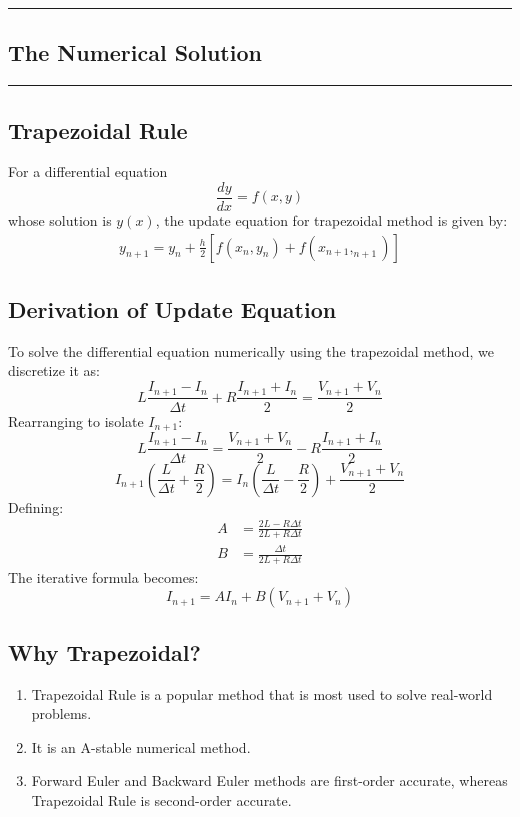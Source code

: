 \newpage
{\color{gray}\hrule}
\begin{center}
\section{The Numerical Solution}
\bigskip
\end{center}
{\color{gray}\hrule}
\begin{multicols}{2}

\subsection{Trapezoidal Rule}
For a differential equation $$\frac{dy}{dx} = f(x,y)$$ whose solution is $y(x)$, the update equation for trapezoidal method is given by:
\begin{align}
    y_{n+1} = y_n + \frac{h}{2}\left[ f(x_n,y_n) + f(x_{n+1},_{n+1}) \right]
\end{align}
\subsection{Derivation of Update Equation}
To solve the differential equation numerically using the trapezoidal method, we discretize it as:
\begin{equation}
L \frac{I_{n+1} - I_n}{\Delta t} + R \frac{I_{n+1} + I_n}{2} = \frac{V_{n+1} + V_n}{2}
\end{equation}
Rearranging to isolate $I_{n+1}$:
\begin{equation}
L \frac{I_{n+1} - I_n}{\Delta t} = \frac{V_{n+1} + V_n}{2} - R \frac{I_{n+1} + I_n}{2}
\end{equation}
\begin{equation}
I_{n+1} \left( \frac{L}{\Delta t} + \frac{R}{2} \right) = I_n \left( \frac{L}{\Delta t} - \frac{R}{2} \right) + \frac{V_{n+1} + V_n}{2}
\end{equation}
Defining:
\begin{align}
A &= \frac{2L - R \Delta t}{2L + R \Delta t} \\
B &= \frac{\Delta t}{2L + R \Delta t}
\end{align}
The iterative formula becomes:
\begin{equation}
I_{n+1} = A I_n + B (V_{n+1} + V_n)
\end{equation}
\subsection{Why Trapezoidal?}
\begin{enumerate}
    \item Trapezoidal Rule is a popular method that is most used to solve real-world problems.
    \item It is an A-stable numerical method.
    \item Forward Euler and Backward Euler methods are first-order accurate, whereas Trapezoidal Rule is second-order accurate.
\end{enumerate}


\end{multicols}
